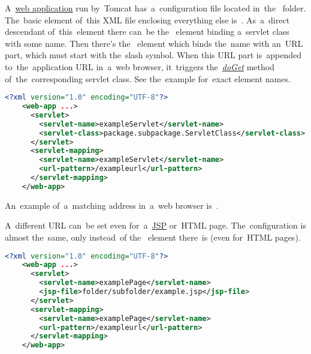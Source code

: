 \label{tomcatservleturl}
A~\hyperref[webserviceapplication]{web application} run by~Tomcat has~a~configuration file  located in~the~ folder.
The~basic element of~this XML file enclosing everything else is~.
As~a~direct descendant of~this~element there can~be the~ element binding a~servlet class with some name.
Then there's the~ element which binds the~name with an~URL part, which must start with the~slash symbol.
When this URL part is~appended to~the~application URL in~a~web browser, it~triggers the~\hyperref[servicedopostdoget]{\textit{doGet}} method of~the~corresponding servlet class.
See the~example for~exact element names.

\begin{lstlisting}[language=XML]
    <?xml version="1.0" encoding="UTF-8"?>
    <web-app ...>
      <servlet>
        <servlet-name>exampleServlet</servlet-name>
        <servlet-class>package.subpackage.ServletClass</servlet-class>
      </servlet>
      <servlet-mapping>
        <servlet-name>exampleServlet</servlet-name>
        <url-pattern>/exampleurl</url-pattern>
      </servlet-mapping>
    </web-app>
\end{lstlisting}

\noindent An~example of~a~matching address in~a~web browser is~.

A~different URL can~be set even for~a~\hyperref[jsp]{JSP} or~HTML page.
The~configuration is almost the~same, only instead~of the~ element there~is  (even for~HTML pages).

\begin{lstlisting}[language=XML]
    <?xml version="1.0" encoding="UTF-8"?>
    <web-app ...>
      <servlet>
        <servlet-name>examplePage</servlet-name>
        <jsp-file>folder/subfolder/example.jsp</jsp-file>
      </servlet>
      <servlet-mapping>
        <servlet-name>examplePage</servlet-name>
        <url-pattern>/exampleurl</url-pattern>
      </servlet-mapping>
    </web-app>
\end{lstlisting}
